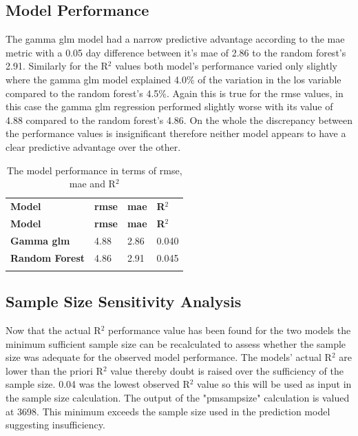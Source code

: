 \documentclass[11pt]{article}
\begin{document}
\subsection{Model Performance}

The gamma \gls{glm} model had a narrow predictive advantage according to the \gls{mae} metric with a 0.05 day difference between it's  \gls{mae} of 2.86 to the random forest's 2.91. Similarly for the R\(^2\) values both model's performance varied only slightly where the gamma \gls{glm} model explained 4.0\% of the variation in the \gls{los} variable compared to the random forest's 4.5\%. Again this is true for the \gls{rmse} values, in this case the gamma \gls{glm} regression performed slightly worse with its value of 4.88 compared to the random forest's 4.86. On the whole the discrepancy between the performance values is insignificant therefore neither model appears to have a clear predictive advantage over the other.

{\seriffont
{\small
\renewcommand{\arraystretch}{1}
\centering
\begin{center}
\setlength{\arrayrulewidth}{0.7mm}
\begin{longtable}{ | L{4cm} | L{3cm} | L{3cm} | L{3cm} | } 
    \hline
    \textbf{Model} & \textbf{\gls{rmse}} & \textbf{\gls{mae}} & \textbf{R\(^2\)}  \\ 
    \noalign{\global\setlength{\arrayrulewidth}{0.7mm}}
    \hline
    \endfirsthead

\hline
\textbf{Model} & \textbf{\gls{rmse}} & \textbf{\gls{mae}} & \textbf{R\(^2\)} \\
\hline
\endhead
\textbf{Gamma \gls{glm}} & 4.88 & 2.86 & 0.040  \\ 
    \noalign{\global\setlength{\arrayrulewidth}{0.05mm}}
    \hline
    \noalign{\global\setlength{\arrayrulewidth}{0.7mm}}
\textbf{Random Forest} & 4.86 & 2.91 & 0.045 \\ 
     \hline
\caption[Model performance]{The model performance in terms of \gls{rmse}, \gls{mae} and R\(^2\)}\label{tab:my_label}\\
\end{longtable}
\end{center}}}
\normalsize

\subsection{Sample Size Sensitivity Analysis}

Now that the actual R\(^2\) performance value has been found for the two models the minimum sufficient sample size can be recalculated to assess whether the sample size was adequate for the observed model performance. The models' actual R\(^2\) are lower than the priori R\(^2\) value thereby doubt is raised over the sufficiency of the sample size. 0.04 was the lowest observed R\(^2\) value so this will be used as input in the sample size calculation. The output of the "pmsampsize" calculation is valued at 3698. This minimum exceeds the sample size used in the prediction model suggesting insufficiency.
\end{document}
